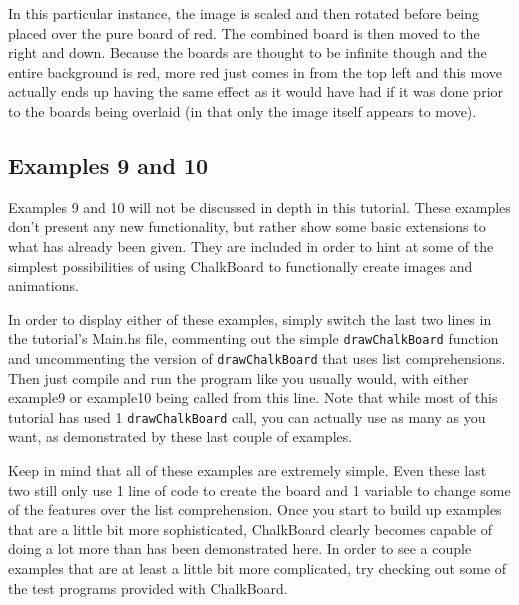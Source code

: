 \documentclass{article}
\begin{document}
In this particular instance, the image is scaled and then rotated before being placed over the pure board
of red. The combined board is then moved to the right and down. Because the boards are thought to be infinite
though and the entire background is red, more red just comes in from the top left and this move actually ends
up having the same effect as it would have had if it was done prior to the boards being overlaid (in that
only the image itself appears to move).

\vspace{0.1in}




\newpage
\subsection{Examples 9 and 10}

Examples 9 and 10 will not be discussed in depth in this tutorial. These examples don't present any new
functionality, but rather show some basic extensions to what has already been given. They are included
in order to hint at some of the simplest possibilities of using ChalkBoard to functionally create images
and animations.

In order to display either of these examples, simply switch the last two lines in the tutorial's Main.hs file,
commenting out the simple \texttt{drawChalkBoard} function and uncommenting the version of
\texttt{drawChalkBoard} that uses list comprehensions. Then just compile and run the program like you usually
would, with either example9 or example10 being called from this line. Note that while most of this tutorial
has used 1 \texttt{drawChalkBoard} call, you can actually use as many as you want, as demonstrated by these
last couple of examples.

Keep in mind that all of these examples are extremely simple. Even these last two still only use 1 line of code
to create the board and 1 variable to change some of the features over the list comprehension. Once you start
to build up examples that are a little bit more sophisticated, ChalkBoard clearly becomes capable of doing a lot more
than has been demonstrated here. In order to see a couple examples that are at least a little bit more complicated, try
checking out some of the test programs provided with ChalkBoard.
\end{document}
